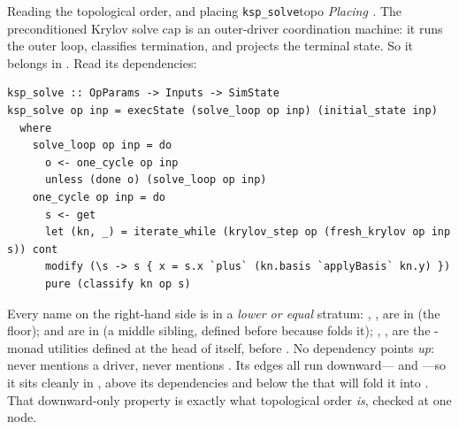 \begin{workedexample}{Reading the topological order, and placing \texttt{ksp\_solve}}{topo}
\emph{Placing .} The preconditioned Krylov solve cap is an
outer-driver coordination machine: it runs the outer loop, classifies termination,
and projects the terminal state. So it belongs in . Read its
dependencies:
\begin{lstlisting}[style=l4style]
ksp_solve :: OpParams -> Inputs -> SimState
ksp_solve op inp = execState (solve_loop op inp) (initial_state inp)
  where
    solve_loop op inp = do
      o <- one_cycle op inp
      unless (done o) (solve_loop op inp)
    one_cycle op inp = do
      s <- get
      let (kn, _) = iterate_while (krylov_step op (fresh_krylov op inp s)) cont
      modify (\s -> s { x = s.x `plus` (kn.basis `applyBasis` kn.y) })
      pure (classify kn op s)
\end{lstlisting}
Every name on the right-hand side is in a \emph{lower or equal} stratum:
, ,  are in  (the floor);
 and  are in  (a middle
sibling, defined before  because  folds it);
, ,  are the -monad utilities
defined at the head of  itself, before . No
dependency points \emph{up}:  never mentions a driver, never
mentions . Its  edges all run downward---
and ---so it sits cleanly in , above its
dependencies and below the  that will fold it into
. That downward-only property is exactly what topological order
\emph{is}, checked at one node.
\end{workedexample}

